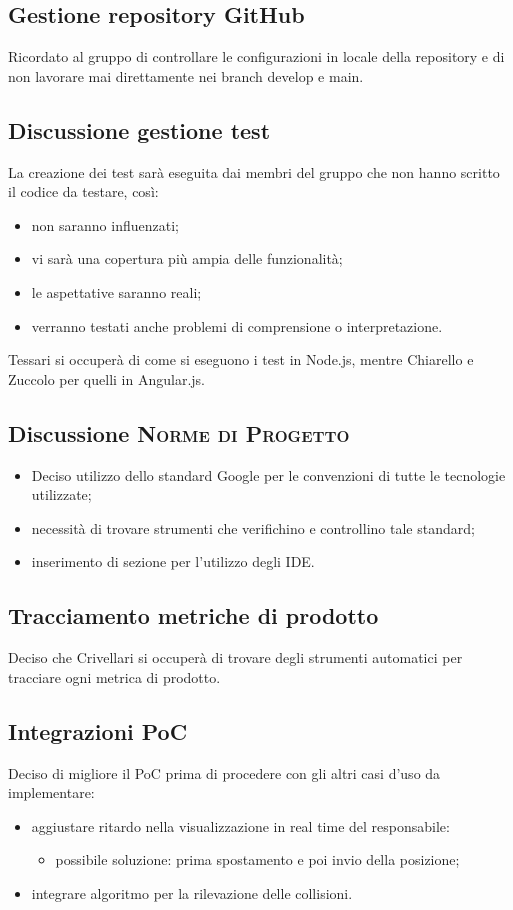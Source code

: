 \subsection{Gestione repository GitHub}
Ricordato al gruppo di controllare le configurazioni in locale della repository e di non lavorare mai direttamente nei branch develop e main.

\subsection{Discussione gestione test}
La creazione dei test sarà eseguita dai membri del gruppo che non hanno scritto il codice da testare, così:
	\begin{itemize}
		\item non saranno influenzati;
		\item vi sarà una copertura più ampia delle funzionalità;
		\item le aspettative saranno reali;
		\item verranno testati anche problemi di comprensione o interpretazione.
	\end{itemize}
Tessari si occuperà di come si eseguono i test in Node.js, mentre Chiarello e Zuccolo per quelli in Angular.js.
\subsection{Discussione \textsc{Norme di Progetto}}
\begin{itemize}
	\item Deciso utilizzo dello standard Google per le convenzioni di tutte le tecnologie utilizzate;
	\item necessità di trovare strumenti che verifichino e controllino tale standard;
	\item inserimento di sezione per l'utilizzo degli IDE.
\end{itemize}
\subsection{Tracciamento metriche di prodotto}
Deciso che Crivellari si occuperà di trovare degli strumenti automatici per tracciare ogni metrica di prodotto.

\subsection{Integrazioni PoC}
Deciso di migliore il PoC prima di procedere con gli altri casi d'uso da implementare:
	\begin{itemize}
		\item aggiustare ritardo nella visualizzazione in real time del responsabile:
			\begin{itemize}
				\item possibile soluzione: prima spostamento e poi invio della posizione;
			\end{itemize}
		\item integrare algoritmo per la rilevazione delle collisioni.
	\end{itemize}
